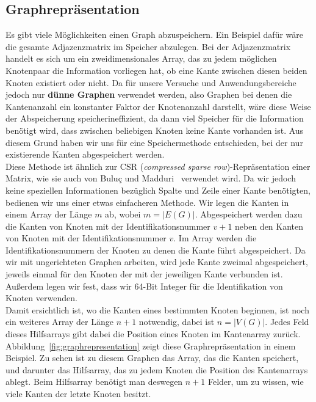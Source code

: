 \documentclass[11pt,a4paper]{article}
\begin{document}
\subsection{Graphrepräsentation}
\label{sec:graphrepresentation}
Es gibt viele Möglichkeiten einen Graph abzuspeichern. Ein Beispiel dafür wäre die gesamte Adjazenzmatrix im Speicher abzulegen. Bei der Adjazenzmatrix handelt es sich um ein zweidimensionales Array, das zu jedem möglichen Knotenpaar die Information vorliegen hat, ob eine Kante zwischen diesen beiden Knoten existiert oder nicht. Da für unsere Versuche und Anwendungsbereiche jedoch nur \textbf{dünne Graphen} verwendet werden, also Graphen bei denen die Kantenanzahl ein konstanter Faktor der Knotenanzahl  darstellt, wäre diese Weise der Abspeicherung speicherineffizient, da dann viel Speicher für die Information benötigt wird, dass zwischen beliebigen Knoten keine Kante vorhanden ist. Aus diesem Grund haben wir uns für eine Speichermethode entschieden, bei der nur existierende Kanten abgespeichert werden.\\
Diese Methode ist ähnlich zur CSR (\textit{compressed sparse row})-Repräsentation einer Matrix, wie sie auch von Buluç und Madduri~\cite{buluc} verwendet wird. Da wir jedoch keine speziellen Informationen bezüglich Spalte und Zeile einer Kante benötigten, bedienen wir uns einer etwas einfacheren Methode. Wir legen die Kanten in einem Array der Länge \(m\) ab, wobei \(m = |E(G)|\). Abgespeichert werden dazu die Kanten von Knoten mit der Identifikationsnummer \(v+1\) neben den Kanten von Knoten mit der Identifikationsnummer \(v\). Im Array werden die Identifikationsnummern der Knoten zu denen die Kante führt abgespeichert. Da wir mit ungerichteten Graphen arbeiten, wird jede Kante zweimal abgespeichert, jeweils einmal für den Knoten der mit der jeweiligen Kante verbunden ist. Außerdem legen wir fest, dass wir 64-Bit Integer für die Identifikation von Knoten verwenden.\\
Damit ersichtlich ist, wo die Kanten eines bestimmten Knoten beginnen, ist noch ein weiteres Array der Länge \(n+1\) notwendig, dabei ist \(n = |V(G)|\). Jedes Feld dieses Hilfsarrays gibt dabei die Position eines Knoten im Kantenarray zurück. Abbildung~\ref{fig:graphrepresentation} zeigt diese Graphrepräsentation in einem Beispiel. Zu sehen ist zu diesem Graphen das Array, das die Kanten speichert, und darunter das Hilfsarray, das zu jedem Knoten die Position des Kantenarrays ablegt. Beim Hilfsarray benötigt man deswegen \(n+1\) Felder, um zu wissen, wie viele Kanten der letzte Knoten besitzt.
\end{document}
